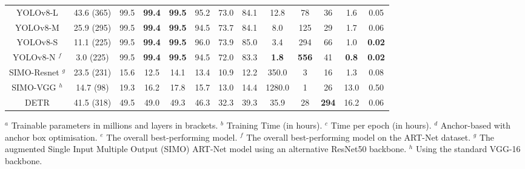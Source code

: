 \begin{table}[htbp]
\begin{tabular}{|c|c|c|c|c|c|c|c|c|c|c|c|c|}
    YOLOv8-L & 43.6 (365) & 99.5 & \textbf{99.4} & \textbf{99.5} & 95.2 & 73.0 & 84.1 & 12.8 & 78 & 36 & 1.6 & 0.05 \\ 
    YOLOv8-M & 25.9 (295) & 99.5 & \textbf{99.4} & \textbf{99.5} & 94.5 & 73.7 & 84.1 & 8.0 & 125 & 29 & 1.7 & 0.06 \\ 
    YOLOv8-S & 11.1 (225) & 99.5 & \textbf{99.4} & \textbf{99.5} & 96.0 & 73.9 & 85.0 & 3.4 & 294 & 66 & 1.0 & \textbf{0.02} \\ 
    \rowcolor{pink} YOLOv8-N $^f$ & 3.0 (225) & 99.5 & \textbf{99.4} & \textbf{99.5} & 94.5 & 72.0 & 83.3 & \textbf{1.8} & \textbf{556} & 41 & \textbf{0.8} & \textbf{0.02} \\ 
    SIMO-Resnet $^g$  & 23.5 (231) & 15.6 & 12.5 & 14.1 & 13.4 & 10.9 & 12.2 & 350.0 & 3 & 16 & 1.3 & 0.08 \\ 
    SIMO-VGG $^h$  & 14.7 (98) & 19.3 & 16.2 & 17.8 & 15.7 & 13.0 & 14.4 & 1280.0 & 1 & 26 & 13.0 & 0.50 \\ 
    DETR & 41.5 (318) & 49.5 & 49.0 & 49.3 & 46.3 & 32.3 & 39.3 & 35.9 & 28 & \textbf{294} & 16.2 & 0.06 \\
    \hline
\end{tabular}
\newline
\scriptsize{$^a$ Trainable parameters in millions and layers in brackets. $^b$ Training Time (in hours). $^c$ Time per epoch (in hours). $^d$ Anchor-based with anchor box optimisation. $^e$ The overall best-performing model. $^f$ The overall best-performing model on the ART-Net dataset. $^g$ The augmented Single Input Multiple Output (SIMO) ART-Net model using an alternative ResNet50 backbone. $^h$ Using the standard VGG-16 backbone.}
\end{table}

